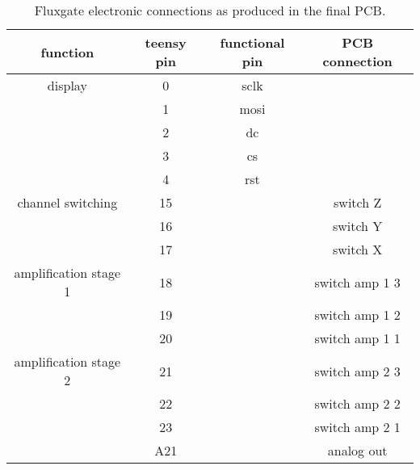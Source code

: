             \begin{table}
                \centering
                \begin{tabular}{|c|c|c|c|}
                    \hline
                    function & teensy pin & functional pin& PCB connection  \\
                    \hline
                    display&0 & sclk&\\
                    &1 & mosi&\\
                    &2 & dc&\\
                    &3 & cs&\\
                    &4 & rst&\\
                    \hline
                    channel switching&15 & & switch Z\\
                    &16 & & switch Y\\
                    &17 & & switch X\\
                    \hline
                    amplification stage 1&18 & & switch amp 1 3\\
                    &19 & & switch amp 1 2\\
                    &20 & & switch amp 1 1\\
                    \hline
                    amplification stage 2&21 & & switch amp 2 3\\
                    &22 & & switch amp 2 2\\
                    &23 & & switch amp 2 1\\
                    &A21 & & analog out\\
                    \hline
                \end{tabular}
                \caption[Fluxgate connections]{Fluxgate electronic connections as produced in the final PCB.}
            \end{table}
